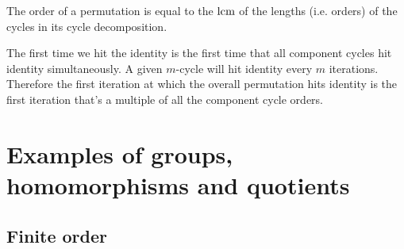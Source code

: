 \begin{theorem*}
  The order of a permutation is equal to the $\text{lcm}$ of the lengths (i.e. orders) of the cycles in
  its cycle decomposition.
\end{theorem*}

\begin{intuition*}
  The first time we hit the identity is the first time that all component cycles hit identity
  simultaneously. A given $m$-cycle will hit identity every $m$ iterations. Therefore the first
  iteration at which the overall permutation hits identity is the first iteration that's a multiple
  of all the component cycle orders.
\end{intuition*}


\section{Examples of groups, homomorphisms and quotients}

\subsection{Finite order}

